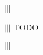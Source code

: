         $|$\hs$|$\hs$|$\hs$|$\hs \par
        $|$\hs$|$\hs$|$\hs$|$\hs TODO



        $|$\hs$|$\hs$|$\hs$|$\hs \par

